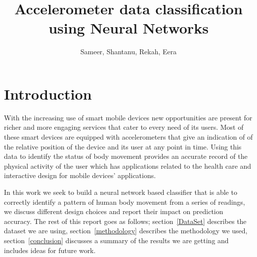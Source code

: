\documentclass{article}
\begin{document}
\title{Accelerometer data classification using Neural Networks}
\author{ Sameer, Shantanu, Rekah, Eera}

\tableofcontents
\pagebreak
\listoffigures

\pagebreak


\maketitle


\section{Introduction}
\label{introduction}

With the increasing use of smart mobile devices new opportunities are present for richer and more engaging services 
that cater to every need of its users. Most of these smart devices are equipped with accelerometers that give an
indication of of the relative position of the device and its user at any point in time. Using this data to identify the 
status of body movement provides an accurate record of the physical activity of the user which has applications related 
to the health care and interactive design for mobile devices' applications. 

In this work we seek to build a neural network based classifier that is able to correctly identify a pattern of human body 
movement from a series of readings, we discuss different design choices and report their impact on prediction accuracy. The 
rest of this report goes as follows; section~\ref{DataSet} describes the dataset we are using, section~\ref{methodology} describes 
the methodology we used, section~\ref{conclusion} discusses a summary of the results we are getting and includes ideas for future work.
\end{document}
